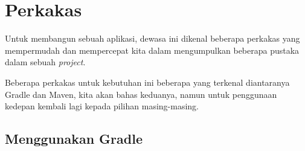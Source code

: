 \chapter{Perkakas}

Untuk membangun sebuah aplikasi, dewasa ini dikenal beberapa perkakas yang mempermudah dan mempercepat kita dalam mengumpulkan beberapa pustaka dalam sebuah \textit{project}.

Beberapa perkakas untuk kebutuhan ini beberapa yang terkenal diantaranya Gradle dan Maven, kita akan bahas keduanya, namun untuk penggunaan kedepan kembali lagi kepada pilihan masing-masing.

\section{Menggunakan Gradle}

